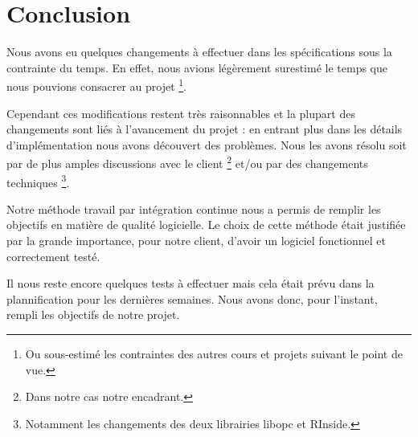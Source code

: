 \documentclass[a4paper,titlepage,french]{report}
\begin{document}
\chapter*{Conclusion}

Nous avons eu quelques changements à effectuer dans les spécifications sous la contrainte du temps.
En effet, nous avions légèrement surestimé le temps que nous pouvions consacrer au projet \footnote{Ou sous-estimé les contraintes des autres cours et projets suivant le point de vue.}.

Cependant ces modifications restent très raisonnables et la plupart des changements sont liés à l'avancement du projet : en entrant plus dans les détails d'implémentation nous avons découvert des problèmes. Nous les avons résolu soit par de plus amples discussions avec le client \footnote{Dans notre cas notre encadrant.} et/ou par des changements techniques \footnote{Notamment les changements des deux librairies libopc et RInside.}.

Notre méthode travail par intégration continue nous a permis de remplir les objectifs en matière de qualité logicielle.
Le choix de cette méthode était justifiée par la grande importance, pour notre client, d'avoir un logiciel fonctionnel et correctement testé.

Il nous reste encore quelques tests à effectuer mais cela était prévu dans la plannification pour les dernières semaines.
Nous avons donc, pour l'instant, rempli les objectifs de notre projet.
\end{document}
